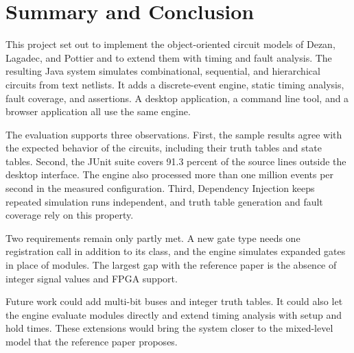 \section{Summary and Conclusion}
\label{sec:conclusion}

This project set out to implement the object-oriented circuit models of Dezan, Lagadec, and Pottier  and to extend them with timing and fault analysis.
The resulting Java system simulates combinational, sequential, and hierarchical circuits from text netlists.
It adds a discrete-event engine, static timing analysis, fault coverage, and assertions.
A desktop application, a command line tool, and a browser application all use the same engine.

The evaluation supports three observations.
First, the sample results agree with the expected behavior of the circuits, including their truth tables and state tables.
Second, the JUnit suite covers 91.3 percent of the source lines outside the desktop interface.
The engine also processed more than one million events per second in the measured configuration.
Third, Dependency Injection keeps repeated simulation runs independent, and truth table generation and fault coverage rely on this property.

Two requirements remain only partly met.
A new gate type needs one registration call in addition to its class, and the engine simulates expanded gates in place of modules.
The largest gap with the reference paper is the absence of integer signal values and FPGA support.

Future work could add multi-bit buses and integer truth tables.
It could also let the engine evaluate modules directly and extend timing analysis with setup and hold times.
These extensions would bring the system closer to the mixed-level model that the reference paper proposes.
